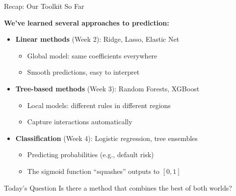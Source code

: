 \documentclass[10pt]{beamer}
\begin{document}
\begin{frame}{Recap: Our Toolkit So Far}

  \textbf{We've learned several approaches to prediction:}

  \vspace{1em}
  \begin{itemize}
    \item \textbf{Linear methods} (Week 2): Ridge, Lasso, Elastic Net
    \begin{itemize}
      \item Global model: same coefficients everywhere
      \item Smooth predictions, easy to interpret
    \end{itemize}

    \vspace{0.5em}
    \item \textbf{Tree-based methods} (Week 3): Random Forests, XGBoost
    \begin{itemize}
      \item Local models: different rules in different regions
      \item Capture interactions automatically
    \end{itemize}

    \vspace{0.5em}
    \item \textbf{Classification} (Week 4): Logistic regression, tree ensembles
    \begin{itemize}
      \item Predicting probabilities (e.g., default risk)
      \item The sigmoid function ``squashes'' outputs to $[0, 1]$
    \end{itemize}
  \end{itemize}

  \vspace{0.5em}
  \begin{block}{Today's Question}
    Is there a method that combines the best of both worlds?
  \end{block}
\end{frame}

\end{document}
